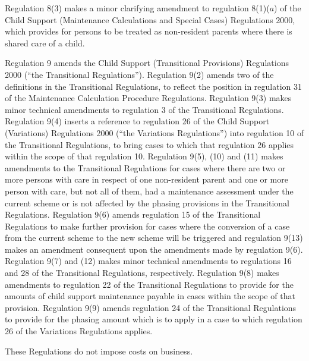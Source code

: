 \documentclass[12pt,a4paper]{article}
\begin{document}
Regulation 8(3) makes a minor clarifying amendment to regulation 8(1)($a$)  of the Child Support (Maintenance Calculations and Special Cases) Regulations 2000, which provides for persons to be treated as non-resident parents where there is shared care of a child.

Regulation 9 amends the Child Support (Transitional Provisions) Regulations 2000 (“the Transitional Regulations”). Regulation 9(2) amends two of the definitions in the Transitional Regulations, to reflect the position in regulation 31 of the Maintenance Calculation Procedure Regulations. Regulation 9(3) makes minor technical amendments to regulation 3 of the Transitional Regulations. Regulation 9(4) inserts a reference to regulation 26 of the Child Support (Variations) Regulations 2000 (“the Variations Regulations”) into regulation 10 of the Transitional Regulations, to bring cases to which that regulation 26 applies within the scope of that regulation 10. Regulation 9(5), (10) and (11) makes amendments to the Transitional Regulations for cases where there are two or more persons with care in respect of one non-resident parent and one or more person with care, but not all of them, had a maintenance assessment under the current scheme or is not affected by the phasing provisions in the Transitional Regulations. Regulation 9(6) amends regulation 15 of the Transitional Regulations to make further provision for cases where the conversion of a case from the current scheme to the new scheme will be triggered and regulation 9(13) makes an amendment consequent upon the amendments made by regulation 9(6). Regulation 9(7) and (12) makes minor technical amendments to regulations 16 and 28 of the Transitional Regulations, respectively. Regulation 9(8) makes amendments to regulation 22 of the Transitional Regulations to provide for the amounts of child support maintenance payable in cases within the scope of that provision. Regulation 9(9) amends regulation 24 of the Transitional Regulations to provide for the phasing amount which is to apply in a case to which regulation 26 of the Variations Regulations applies.

These Regulations do not impose costs on business. 
\end{document}
